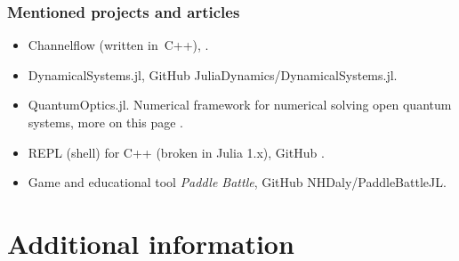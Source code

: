 \documentclass[10pt,t]{beamer}
\begin{document}
\begin{frame}
  \frametitle{Mentioned projects and articles}


    \begin{itemize}

    \item Channelflow (written in~C++),
      .

    \item DynamicalSystems.jl, GitHub
      {JuliaDynamics/DynamicalSystems.jl}.

    \item QuantumOptics.jl. Numerical framework for numerical
      solving open quantum systems, more on this page
      .

    \item REPL (shell) for C++ (broken in Julia 1.x), GitHub
      .

    \item Game and educational tool \textit{Paddle Battle}, GitHub
      {NHDaly/PaddleBattleJL}.

    \end{itemize}


\end{frame}










\section{Additional information}
\end{document}
